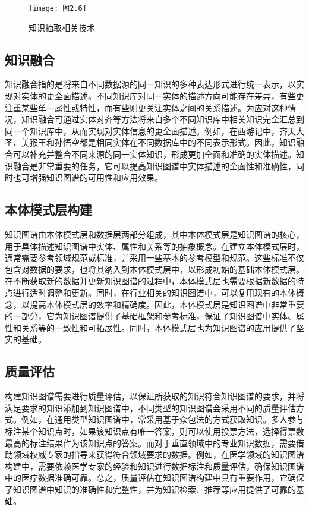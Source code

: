 \documentclass[bachelor_p]{hdu-thesis}
\begin{document}
\begin{figure}[h]
  \centering
  \texttt{[image: 图2.6]}
  \caption{知识抽取相关技术} \label{fig:graph.26}
\end{figure}

\subsection{知识融合}
知识融合指的是将来自不同数据源的同一知识的多种表达形式进行统一表示，以实现对实体的更全面描述。不同知识库对同一实体的描述方向可能存在差异，有些更注重某些单一属性或特性，而有些则更关注实体之间的关系描述。为应对这种情况，知识融合可通过实体对齐等方法将来自多个不同知识库中相关知识完全汇总到同一个知识库中，从而实现对实体信息的更全面描述。例如，在西游记中，齐天大圣、美猴王和孙悟空都是相同实体在不同数据库中的不同表示形式。因此，知识融合可以补充并整合不同来源的同一实体知识，形成更加全面和准确的实体描述。知识融合是非常重要的任务，它可以提高知识图谱中实体描述的全面性和准确性，同时也可增强知识图谱的可用性和应用效果。
\subsection{本体模式层构建}
知识图谱由本体模式层和数据层两部分组成，其中本体模式层是知识图谱的核心，用于具体描述知识图谱中实体、属性和关系等的抽象概念。在建立本体模式层时，通常需要参考领域规范或标准，并采用一些基本的参考模型和规范。这些标准不仅包含对数据的要求，也将其纳入到本体模式层中，以形成初始的基础本体模式层。在不断获取新的数据并更新知识图谱的过程中，本体模式层也需要根据新数据的特点进行适时调整和更新。同时，在行业相关的知识图谱中，可以复用现有的本体概念，以提高本体模式层的效率和精确度。因此，本体模式层是知识图谱中非常重要的一部分，它为知识图谱提供了基础框架和参考标准，保证了知识图谱中实体、属性和关系等的一致性和可拓展性。同时，本体模式层也为知识图谱的应用提供了坚实的基础。
\subsection{质量评估}
构建知识图谱需要进行质量评估，以保证所获取的知识符合知识图谱的要求，并将满足要求的知识添加到知识图谱中，不同类型的知识图谱会采用不同的质量评估方式。例如，在通用类型知识图谱中，常采用基于众包法的方式获取知识。多人参与标注某个知识点时，如果该知识点有唯一答案，则可以使用投票方法，选择得票数最高的标注结果作为该知识点的答案。而对于垂直领域中的专业知识数据，需要借助领域权威专家的指导来获得符合领域要求的数据。例如，在医学领域的知识图谱构建中，需要依赖医学专家的经验和知识进行数据标注和质量评估，确保知识图谱中的医疗数据准确可靠。总之，质量评估在知识图谱构建中具有重要作用，它确保了知识图谱中知识的准确性和完整性，并为知识检索、推荐等应用提供了可靠的基础。
\end{document}

